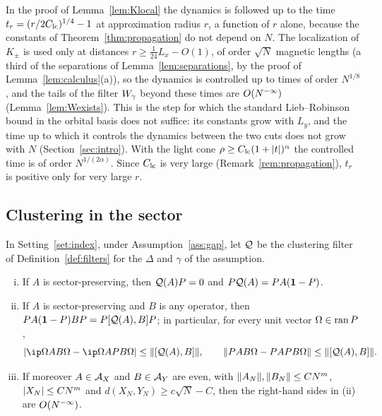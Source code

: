\begin{remark}\label{rem:crossing}
In the proof of Lemma~\ref{lem:Klocal} the dynamics is followed up to the time $t_r=(r/2C_{\rm lc})^{1/4}-1$ at
approximation radius $r$, a function of $r$ alone, because the constants of Theorem~\ref{thm:propagation} do not
depend on $N$. The localization of $K_\pm$ is used only at distances $r\ge\frac1{24}L_x-O(1)$, of order $\sqrt N$
magnetic lengths (a third of the separations of Lemma~\ref{lem:separations}, by the proof of
Lemma~\ref{lem:calculus}(a)), so the dynamics is controlled up to times of order $N^{1/8}$, and
the tails of the filter $W_{\gamma}$ beyond these times are $O(N^{-\infty})$ (Lemma~\ref{lem:Wexists}). This is the step for which
the standard Lieb--Robinson bound in the orbital basis does not suffice: its constants grow with $L_y$, and the
time up to which it controls the dynamics between the two cuts does not grow with $N$
(Section~\ref{sec:intro}). With the light cone $\rho\ge C_{\rm lc}(1+\lvert t\rvert)^\alpha$ the controlled
time is of order $N^{1/(2\alpha)}$. Since $C_{\rm lc}$ is very large (Remark~\ref{rem:propagation}), $t_r$ is positive only
for very large $r$.
\end{remark}

\subsection{Clustering in the sector}

\begin{proposition}\label{prop:clustering}
In Setting~\ref{set:index}, under Assumption~\ref{ass:gap}, let $\mathcal{Q}$ be the clustering filter of
Definition~\ref{def:filters} for the $\Delta$ and $\gamma$ of the assumption.
\begin{enumerate}[(i)]
\item If $A$ is sector-preserving, then $\mathcal{Q}(A)P=0$ and $P\mathcal{Q}(A)=PA(\mathbf{1}-P)$.
\item If $A$ is sector-preserving and $B$ is any operator, then $PA(\mathbf{1}-P)BP=P[\mathcal{Q}(A),B]P$; in particular, for
every unit vector $\Omega\in\operatorname{ran} P$,
\[
\abs{\ip\Omega{AB\Omega}-\ip\Omega{APB\Omega}}\le\norm{[\Qf(A),B]},\qquad\norm{PAB\Omega-PAPB\Omega}\le\norm{[\Qf(A),B]}.
\]
\item If moreover $A\in\mathcal{A}_X$ and $B\in\mathcal{A}_Y$ are even, with $\lVert A_N\rVert,\lVert B_N\rVert\le CN^{m}$, $\lvert X_N\rvert\le CN^{m}$ and
$d(X_N,Y_N)\ge c\sqrt N-C$, then the right-hand sides in (ii) are $O(N^{-\infty})$.
\end{enumerate}
\end{proposition}

